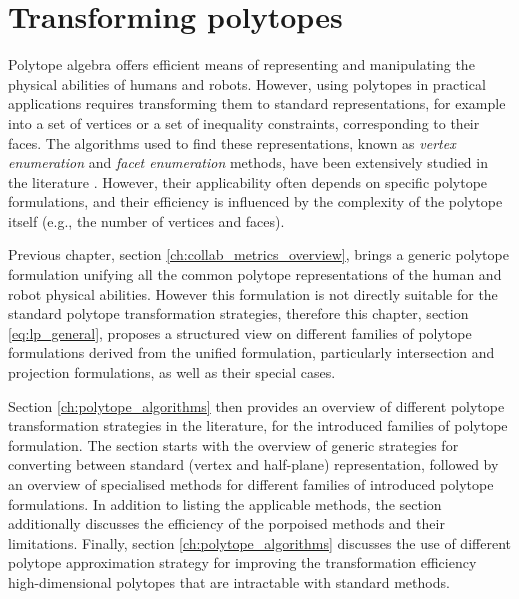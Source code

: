 

\chapter{Transforming polytopes}

Polytope algebra offers efficient means of representing and manipulating the physical abilities of humans and robots. However, using polytopes in practical applications requires transforming them to standard representations, for example into a set of vertices or a set of inequality constraints, corresponding to their faces. The algorithms used to find these representations, known as \textit{vertex enumeration} and \textit{facet enumeration} methods, have been extensively studied in the literature \cite{fukuda2004frequently}. However, their applicability often depends on specific polytope formulations, and their efficiency is influenced by the complexity of the polytope itself (e.g., the number of vertices and faces).

Previous chapter, section \ref{ch:collab_metrics_overview}, brings a generic polytope formulation unifying all the common polytope representations of the human and robot physical abilities. However this formulation is not directly suitable for the standard polytope transformation strategies, therefore this chapter, section \ref{eq:lp_general}, proposes a structured view on different families of polytope formulations derived from the unified formulation, particularly intersection and projection formulations, as well as their special cases. 

Section \ref{ch:polytope_algorithms} then provides an overview of different polytope transformation strategies in the literature, for the introduced families of polytope formulation. The section starts with the overview of generic strategies for converting between standard (vertex and half-plane) representation, followed by an overview of specialised methods for different families of introduced polytope formulations. In addition to listing the applicable methods, the section additionally discusses the efficiency of the porpoised methods and their limitations. Finally, section \ref{ch:polytope_algorithms} discusses the use of different polytope approximation strategy for improving the transformation efficiency high-dimensional polytopes that are intractable with standard methods. 

